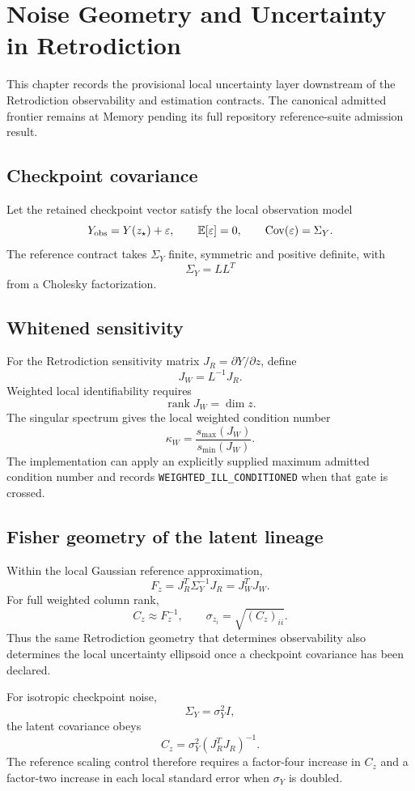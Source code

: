 \chapter{Noise Geometry and Uncertainty in Retrodiction}

This chapter records the provisional local uncertainty layer downstream of the Retrodiction observability and estimation contracts. The canonical admitted frontier remains at Memory pending its full repository reference-suite admission result.

\section{Checkpoint covariance}

Let the retained checkpoint vector satisfy the local observation model
\[
Y_{\rm obs}=Y(z_\star)+\varepsilon,
\qquad
\mathbb E[\varepsilon]=0,
\qquad
\operatorname{Cov}(\varepsilon)=\Sigma_Y.
\]
The reference contract takes \(\Sigma_Y\) finite, symmetric and positive definite, with
\[
\boxed{\Sigma_Y=LL^T}
\]
from a Cholesky factorization.

\section{Whitened sensitivity}

For the Retrodiction sensitivity matrix \(J_R=\partial Y/\partial z\), define
\[
\boxed{J_W=L^{-1}J_R.}
\]
Weighted local identifiability requires
\[
\boxed{\operatorname{rank}J_W=\dim z.}
\]
The singular spectrum gives the local weighted condition number
\[
\boxed{
\kappa_W=\frac{s_{\max}(J_W)}{s_{\min}(J_W)}.
}
\]
The implementation can apply an explicitly supplied maximum admitted condition number and records \texttt{WEIGHTED\_ILL\_CONDITIONED} when that gate is crossed.

\section{Fisher geometry of the latent lineage}

Within the local Gaussian reference approximation,
\[
\boxed{
F_z
=J_R^T\Sigma_Y^{-1}J_R
=J_W^TJ_W.
}
\]
For full weighted column rank,
\[
\boxed{
C_z\approx F_z^{-1},
\qquad
\sigma_{z_i}=\sqrt{(C_z)_{ii}}.
}
\]
Thus the same Retrodiction geometry that determines observability also determines the local uncertainty ellipsoid once a checkpoint covariance has been declared.

For isotropic checkpoint noise,
\[
\Sigma_Y=\sigma_Y^2 I,
\]
the latent covariance obeys
\[
\boxed{
C_z=\sigma_Y^2(J_R^TJ_R)^{-1}.
}
\]
The reference scaling control therefore requires a factor-four increase in \(C_z\) and a factor-two increase in each local standard error when \(\sigma_Y\) is doubled.

